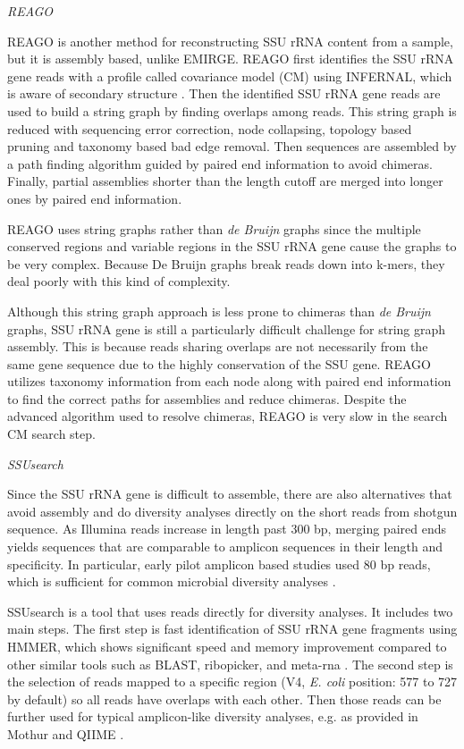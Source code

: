 \documentclass[]{msu-thesis}
\begin{document}
\textit{REAGO}

REAGO is another method for reconstructing SSU rRNA content from a sample,
but it is assembly based, unlike EMIRGE.
REAGO first identifies the SSU rRNA gene reads with a profile called
covariance model (CM) using INFERNAL, which is aware of secondary structure
\cite{nawrocki_infernal_2009}. Then the identified SSU rRNA gene
reads are used to build a string graph by finding overlaps among reads.
This string graph is reduced with 
sequencing error correction, node collapsing, topology based pruning
and taxonomy based bad edge removal. Then sequences are assembled by
a path finding algorithm guided by paired end information to avoid
chimeras. Finally, partial assemblies shorter than the length cutoff
are merged into longer ones by paired end information.

REAGO uses string graphs rather than \textit{de Bruijn} graphs since
the multiple conserved regions and variable regions in the SSU rRNA
gene cause the
graphs to be very complex. Because De Bruijn graphs break reads down
into k-mers, they deal poorly with this kind of complexity.

Although this string graph approach is less prone to chimeras than
\textit{de Bruijn} graphs, SSU rRNA gene is still a particularly
difficult challenge for string graph assembly.  This is because reads sharing
overlaps are not necessarily from the same gene sequence
due to the highly conservation of the SSU gene. REAGO utilizes taxonomy
information from each node along with paired end information to find the
correct paths for assemblies and reduce chimeras. Despite the
advanced algorithm used to resolve chimeras, REAGO is very slow in the
search CM search step.

\textit{SSUsearch}

Since the SSU rRNA gene is difficult to assemble, there are also
alternatives that avoid assembly and do diversity analyses directly on
the short reads from shotgun sequence. As Illumina reads increase in
length past 300 bp, merging paired ends yields sequences that are
comparable to amplicon sequences in their length and specificity.
In particular, early pilot amplicon based studies
used 80 bp reads, which is sufficient for common microbial diversity analyses
\cite{sogin_microbial_2006}.

SSUsearch is a tool that uses reads directly for diversity
analyses. It includes two main steps. The first step is fast
identification of SSU rRNA gene fragments using HMMER, which shows
significant speed and memory improvement compared to other similar
tools such as BLAST, ribopicker, and meta-rna
\cite{altschul_gapped_1997,schmieder_identification_2012,huang_identification_2009}. The
second step is the selection of reads mapped to a specific region (V4,
\textit{E. coli} position: 577 to 727 by default) so all reads have
overlaps with each other. Then those reads can be further used for
typical amplicon-like diversity analyses, e.g. as provided in Mothur and
QIIME \cite{schloss_introducing_2009,kuczynski_using_2012}.
\end{document}
